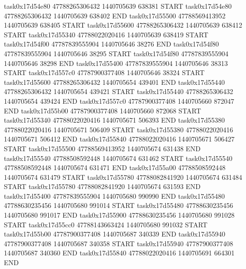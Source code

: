 task0x17d54e80 47788265306432          1440705639               638381  START
task0x17d54e80 47788265306432          1440705639               638402  END
task0x17d55500 47788569413952          1440705639               638405  START
task0x17d55600 47788265306432          1440705639               638412  START
task0x17d55340 47788022020416          1440705639               638419  START
task0x17d54f00 47787839555904          1440705646                38276  END
task0x17d54f80 47787839555904          1440705646                38295  START
task0x17d54f80 47787839555904          1440705646                38298  END
task0x17d55400 47787839555904          1440705646                38313  START
task0x17d557c0 47787900377408          1440705646                38324  START
task0x17d55600 47788265306432          1440705654               439401  END
task0x17d55440 47788265306432          1440705654               439421  START
task0x17d55440 47788265306432          1440705654               439424  END
task0x17d557c0 47787900377408          1440705660               872047  END
task0x17d55b00 47787900377408          1440705660               872068  START
task0x17d55340 47788022020416          1440705671               506393  END
task0x17d55380 47788022020416          1440705671               506409  START
task0x17d55380 47788022020416          1440705671               506412  END
task0x17d55840 47788022020416          1440705671               506427  START
task0x17d55500 47788569413952          1440705674               631438  END
task0x17d55540 47788508592448          1440705674               631462  START
task0x17d55540 47788508592448          1440705674               631471  END
task0x17d55a00 47788508592448          1440705674               631479  START
task0x17d55780 47788082841920          1440705674               631484  START
task0x17d55780 47788082841920          1440705674               631593  END
task0x17d55400 47787839555904          1440705680               990990  END
task0x17d55480 47788630235456          1440705680               991014  START
task0x17d55480 47788630235456          1440705680               991017  END
task0x17d55900 47788630235456          1440705680               991028  START
task0x17d55cc0 47788143663424          1440705680               991032  START
task0x17d55b00 47787900377408          1440705687               340339  END
task0x17d55940 47787900377408          1440705687               340358  START
task0x17d55940 47787900377408          1440705687               340360  END
task0x17d55840 47788022020416          1440705691               664301  END
